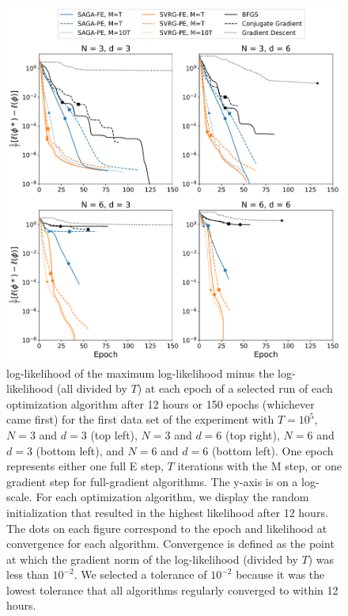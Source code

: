 %
\begin{figure}
    \centering
    \includegraphics[width=6.5in]{../plt/log-like_v_epoch_T-100000-000.png}
    \caption{log-likelihood of the maximum log-likelihood minus the log-likelihood (all divided by $T$) at each epoch of a selected run of each optimization algorithm after 12 hours or 150 epochs (whichever came first) for the first data set of the experiment with $T=10^{5}$, $N=3$ and $d=3$ (top left), $N=3$ and $d=6$ (top right), $N=6$ and $d=3$ (bottom left), and $N=6$ and $d=6$ (bottom left). One epoch represents either one full E step, $T$ iterations with the M step, or one gradient step for full-gradient algorithms. The y-axis is on a log-scale. For each optimization algorithm, we display the random initialization that resulted in the highest likelihood after 12 hours. The dots on each figure correspond to the epoch and likelihood at convergence for each algorithm. Convergence is defined as the point at which the gradient norm of the log-likelihood (divided by $T$) was less than $10^{-2}$. We selected a tolerance of $10^{-2}$ because it was the lowest tolerance that all algorithms regularly converged to within 12 hours.}
    \label{fig:ll_trace_sim}
\end{figure}
